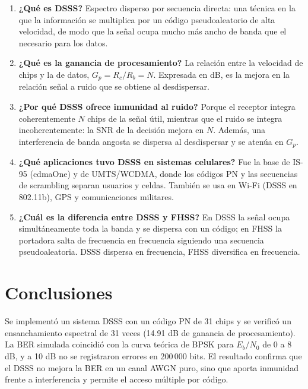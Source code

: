 \documentclass[11pt,a4paper]{article}
\begin{document}
\begin{enumerate}
  \item \textbf{¿Qué es DSSS?} Espectro disperso por secuencia directa: una técnica en la
        que la información se multiplica por un código pseudoaleatorio de alta velocidad,
        de modo que la señal ocupa mucho más ancho de banda que el necesario para los
        datos.
  \item \textbf{¿Qué es la ganancia de procesamiento?} La relación entre la velocidad de
        chips y la de datos, $G_p=R_c/R_b=N$. Expresada en dB, es la mejora en la relación
        señal a ruido que se obtiene al desdispersar.
  \item \textbf{¿Por qué DSSS ofrece inmunidad al ruido?} Porque el receptor integra
        coherentemente $N$ chips de la señal útil, mientras que el ruido se integra
        incoherentemente: la SNR de la decisión mejora en $N$. Además, una interferencia de
        banda angosta se dispersa al desdispersar y se atenúa en $G_p$.
  \item \textbf{¿Qué aplicaciones tuvo DSSS en sistemas celulares?} Fue la base de IS-95
        (cdmaOne) y de UMTS/WCDMA, donde los códigos PN y las secuencias de
        scrambling separan usuarios y celdas. También se usa en Wi-Fi (DSSS en 802.11b),
        GPS y comunicaciones militares.
  \item \textbf{¿Cuál es la diferencia entre DSSS y FHSS?} En DSSS la señal ocupa
        simultáneamente toda la banda y se dispersa con un código; en FHSS la portadora
        salta de frecuencia en frecuencia siguiendo una secuencia pseudoaleatoria. DSSS
        dispersa en frecuencia, FHSS diversifica en frecuencia.
\end{enumerate}

\section{Conclusiones}

Se implementó un sistema DSSS con un código PN de 31 chips y se verificó un ensanchamiento
espectral de 31 veces (14.91 dB de ganancia de procesamiento). La BER simulada coincidió
con la curva teórica de BPSK para $E_b/N_0$ de 0 a 8 dB, y a 10 dB no se registraron
errores en 200\,000 bits. El resultado confirma que el DSSS no mejora la BER en un canal
AWGN puro, sino que aporta inmunidad frente a interferencia y permite el acceso múltiple
por código.
\end{document}
